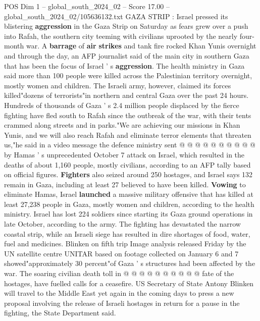 \begin{textsample}{POS Dim 1 – global\_south\_2024\_02 – Score 17.00 – global\_south\_2024\_02/105636132.txt}  \label{ex:f1_pos_206}
GAZA STRIP : Israel pressed its blistering \textbf{aggression} in the Gaza Strip on Saturday as fears grew over a push into Rafah, the southern city teeming with civilians uprooted by the nearly four-month war.
A \textbf{barrage} of \textbf{air} \textbf{strikes} and tank fire rocked Khan Yunis overnight and through the day, an AFP journalist said of the main city in southern Gaza that has been the focus of Israel ' s \textbf{aggression}.
The health ministry in Gaza said more than 100 people were killed across the Palestinian territory overnight, mostly women and children.
The Israeli army, however, claimed its forces killed"dozens of terrorists"in northern and central Gaza over the past 24 hours.
Hundreds of thousands of Gaza ' s 2.4 million people displaced by the fierce fighting have fled south to Rafah since the outbreak of the war, with their tents crammed along streets and in parks."We are achieving our missions in Khan Yunis, and we will also reach Rafah and eliminate terror elements that threaten us,"he said in a video message the defence ministry sent @ @ @ @ @ @ @ @ @ @ by Hamas ' s unprecedented October 7 attack on Israel, which resulted in the deaths of about 1,160 people, mostly civilians, according to an AFP tally based on official figures. \textbf{Fighters} also seized around 250 hostages, and Israel says 132 remain in Gaza, including at least 27 believed to have been killed. \textbf{Vowing} to eliminate Hamas, Israel \textbf{launched} a massive military offensive that has killed at least 27,238 people in Gaza, mostly women and children, according to the health ministry.
Israel has lost 224 soldiers since starting its Gaza ground operations in late October, according to the army.
The fighting has devastated the narrow coastal strip, while an Israeli siege has resulted in dire shortages of food, water, fuel and medicines.
Blinken on fifth trip Image analysis released Friday by the UN satellite centre UNITAR based on footage collected on January 6 and 7 showed"approximately 30 percent"of Gaza ' s structures had been affected by the war.
The soaring civilian death toll in @ @ @ @ @ @ @ @ @ @ fate of the hostages, have fuelled calls for a ceasefire.
US Secretary of State Antony Blinken will travel to the Middle East yet again in the coming days to press a new proposal involving the release of Israeli hostages in return for a pause in the fighting, the State Department said.

\end{textsample}
